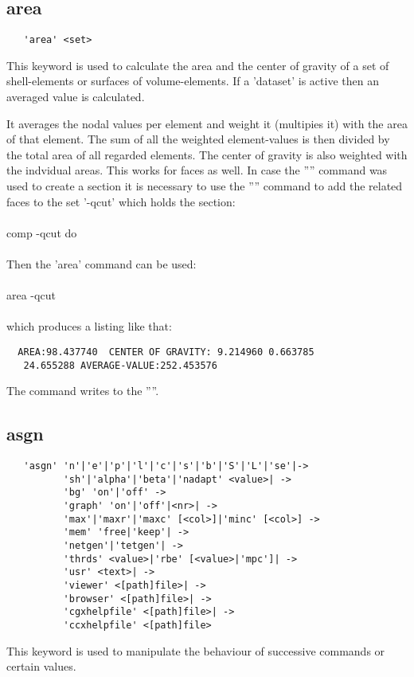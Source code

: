\documentclass{article}
\begin{document}
\subsection{\label{area}area}
\begin{verbatim}
   'area' <set> 
\end{verbatim}
This keyword is used to calculate the area and the center of gravity of a set of shell-elements or surfaces of volume-elements. If a 'dataset' is active then an averaged value is calculated.

It averages the nodal values per element and weight it (multipies it) with the area of that element. The sum of all the weighted element-values is then divided by the total area of all regarded elements. The center of gravity is also weighted with the indvidual areas. This works for faces as well. In case the '''' command was used to create a section it is necessary to use the '''' command to add the related faces to the set '-qcut' which holds the section:\\\\comp -qcut do\\\\Then the 'area' command can be used:\\\\area -qcut\\\\which produces a listing like that:
\begin{verbatim}
  AREA:98.437740  CENTER OF GRAVITY: 9.214960 0.663785
   24.655288 AVERAGE-VALUE:252.453576
\end{verbatim}

The command writes to the ''''.

\subsection{\label{asgn}asgn}
\begin{verbatim}
   'asgn' 'n'|'e'|'p'|'l'|'c'|'s'|'b'|'S'|'L'|'se'|->
          'sh'|'alpha'|'beta'|'nadapt' <value>| ->
          'bg' 'on'|'off' ->
          'graph' 'on'|'off'|<nr>| ->
          'max'|'maxr'|'maxc' [<col>]|'minc' [<col>] ->
          'mem' 'free|'keep'| ->
          'netgen'|'tetgen'| ->
          'thrds' <value>|'rbe' [<value>|'mpc']| ->
          'usr' <text>| ->
          'viewer' <[path]file>| ->
          'browser' <[path]file>| ->
          'cgxhelpfile' <[path]file>| ->
          'ccxhelpfile' <[path]file>
\end{verbatim}
This keyword is used to manipulate the behaviour of successive commands or certain values.
\end{document}
